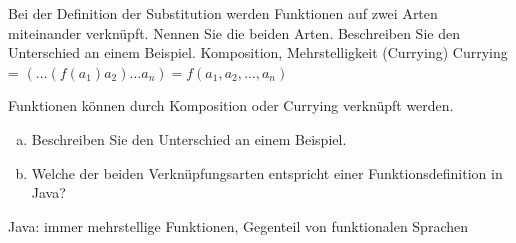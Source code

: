 \begin{card}
	Bei der Definition der Substitution werden Funktionen auf zwei Arten miteinander verknüpft. Nennen Sie die beiden Arten. Beschreiben Sie den Unterschied an einem Beispiel.
	\hr
	Komposition, Mehrstelligkeit (Currying)
	Currying = $(\dots (f(a_1)a_2) \dots a_n) = f(a_1,a_2, \dots, a_n)$
\end{card}

\begin{card}
	Funktionen können durch Komposition oder Currying verknüpft werden.
	\begin{enumerate}[a)]
	\item Beschreiben Sie den Unterschied an einem Beispiel.
	\item Welche der beiden Verknüpfungsarten entspricht einer Funktionsdefinition in Java?
	\end{enumerate}
	\hr
	Java: immer mehrstellige Funktionen, Gegenteil von funktionalen Sprachen
\end{card}